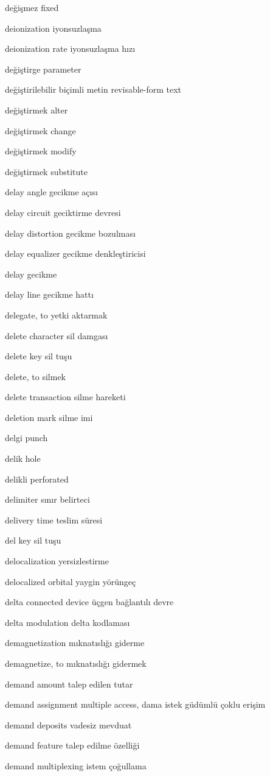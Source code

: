 \documentclass[12pt,fleqn]{article}\usepackage{../../common}
\begin{document}
değişmez fixed

deionization iyonsuzlaşma

deionization rate iyonsuzlaşma hızı

değiştirge parameter

değiştirilebilir biçimli metin revisable-form text

değiştirmek alter

değiştirmek change

değiştirmek modify

değiştirmek substitute

delay angle gecikme açısı

delay circuit geciktirme devresi

delay distortion gecikme bozulması

delay equalizer gecikme denkleştiricisi

delay gecikme

delay line gecikme hattı

delegate, to yetki aktarmak

delete character sil damgası

delete key sil tuşu

delete, to silmek

delete transaction silme hareketi

deletion mark silme imi

delgi punch

delik hole

delikli perforated

delimiter sınır belirteci

delivery time teslim süresi

del key sil tuşu

delocalization yersizlestirme

delocalized orbital yaygin yörüngeç

delta connected device üçgen bağlantılı devre

delta modulation delta kodlaması

demagnetization mıknatıslığı giderme

demagnetize, to mıknatıslığı gidermek

demand amount talep edilen tutar

demand assignment multiple access, dama istek güdümlü çoklu erişim

demand deposits vadesiz mevduat

demand feature talep edilme özelliği

demand multiplexing istem çoğullama
\end{document}
